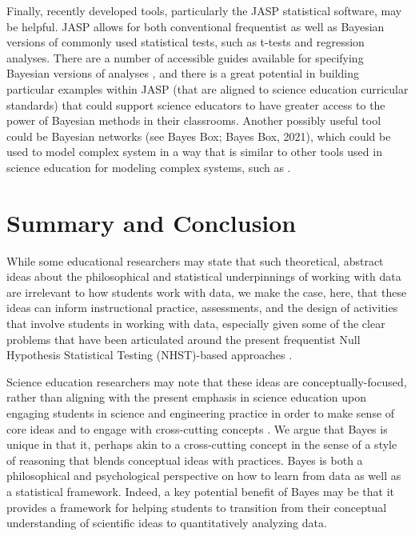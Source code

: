 \documentclass[man]{apa7}
\begin{document}
Finally, recently developed tools, particularly the JASP statistical software, may be helpful. JASP allows for both conventional frequentist as well as Bayesian versions of commonly used statistical tests, such as t-tests and regression analyses. There are a number of accessible guides available for specifying Bayesian versions of analyses \parencite{v20, wagenmakers2018bayesian}, and there is a great potential in building particular examples within JASP (that are aligned to science education curricular standards) that could support science educators to have greater access to the power of Bayesian methods in their classrooms. Another possibly useful tool could be Bayesian networks (see Bayes Box; Bayes Box, 2021), which could be used to model complex system in a way that is similar to other tools used in science education for modeling complex systems, such as \textcite{20}.

\section{Summary and Conclusion}

While some educational researchers may state that such theoretical, abstract ideas about the philosophical and statistical underpinnings of working with data are irrelevant to how students work with data, we make the case, here, that these ideas can inform instructional practice, assessments, and the design of activities that involve students in working with data, especially given some of the clear problems that have been articulated around the present frequentist Null Hypothesis Statistical Testing (NHST)-based approaches \parencite{c14, gkv04}.

Science education researchers may note that these ideas are conceptually-focused, rather than aligning with the present emphasis in science education upon engaging students in science and engineering practice in order to make sense of core ideas and to engage with cross-cutting concepts \parencite{nrc12}. We argue that Bayes is unique in that it, perhaps akin to a cross-cutting concept in the sense of a style of reasoning \parencite{so12, ork18} that blends conceptual ideas with practices. Bayes is both a philosophical and psychological perspective on how to learn from data as well as a statistical framework. Indeed, a key potential benefit of Bayes may be that it provides a framework for helping students to transition from their conceptual understanding of scientific ideas to quantitatively analyzing data.
\end{document}
